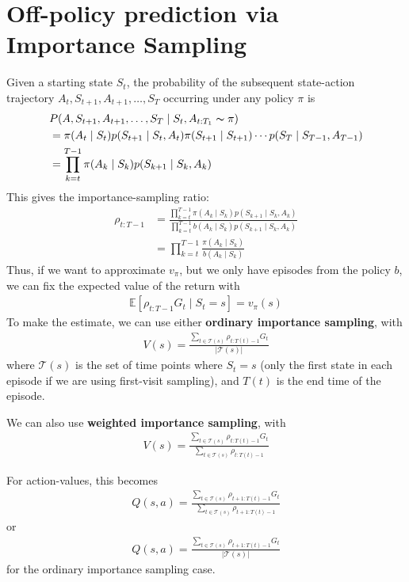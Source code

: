 \documentclass[a4paper,11pt,reqno]{amsart}
\newcounter{prob_counter}
\begin{document}
\section*{Off-policy prediction via Importance Sampling}
Given a starting state $S_t$, the probability of the subsequent state-action trajectory $A_t, S_{t+1}, A_{t+1}, \ldots, S_T$ occurring under any policy $\pi $ is
\begin{align}
&P(A, S_{t+1}, A_{t+1}, \ldots, S_T \mid S_t, A_{t:T_1} \thicksim \pi )\\
&= \pi (A_t \mid S_t) p(S_{t+1} \mid S_t, A_t)\pi (S_{t+1} \mid S_{t+1}) \cdots p(S_T \mid S_{T-1}, A_{T-1}) \\
&= \prod_{k=t}^{T-1} \pi (A_k \mid S_k) p(S_{k+1} \mid S_k, A_k)  
\end{align}
This gives the importance-sampling ratio:
\begin{align}
    \rho _{t:T-1} &= \frac{
    \prod_{k=t}^{T-1}\pi (A_k \mid S_k) p(S_{k+1}\mid S_k, A_k)
}{
    \prod_{k=t}^{T-1} b(A_k \mid S_k) p(S_{k+1}\mid S_k, A_k) 
}\\
    &= \prod_{k=t}^{T-1} \frac{\pi (A_k \mid S_k)}{b(A_k \mid S_k)}
\end{align}
Thus, if we want to approximate $v_{\pi }$, but we only have episodes from the policy $b$, we can fix the expected value of the return with
\begin{align}
\mathbb{E}\left[ \rho _{t:T-1}G_t \mid S_t = s \right] =v_{\pi }(s)
\end{align}
To make the estimate, we can use either \textbf{ordinary importance sampling}, with
\begin{align}
V(s) = \frac{\sum_{t \in \mathcal{T}(s)} \rho _{t:T(t) - 1}G_t}{|\mathcal{T}(s)|}
\end{align}
where $\mathcal{T}(s)$ is the set of time points where $S_{t} = s$ (only the first state in each episode if we are using first-visit sampling), and $T(t)$ is the end time of the episode. 

We can also use \textbf{weighted importance sampling}, with
\begin{align}
V(s) = \frac{\sum_{t \in \mathcal{T}(s)} \rho _{t:T(t) - 1}G_t}{\sum_{t \in \mathcal{T}(s)} \rho _{t:T(t) - 1}}
\end{align}

For action-values, this becomes
\begin{align}
Q(s, a) = \frac{\sum_{t \in \mathcal{T}(s)} \rho _{t+1:T(t) - 1}G_t}{\sum_{t \in \mathcal{T}(s)} \rho _{t + 1:T(t) - 1}}
\end{align}
or 
\begin{align}
Q(s, a) = \frac{\sum_{t \in \mathcal{T}(s)} \rho _{t+1:T(t) - 1}G_t}{|\mathcal{T}(s)|}
\end{align}
for the ordinary importance sampling case. 
\end{document}

